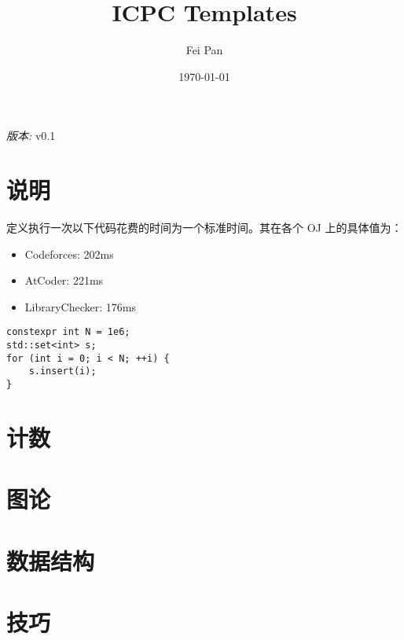 \documentclass[12pt]{ctexart}
\title{ICPC Templates}
\date{\today}
\author{Fei Pan}
\newcommand{\version}{v0.1}
\begin{document}
\maketitle
\begin{center}
    \textit{版本: }\version
\end{center}

\tableofcontents
\newpage

\section{说明}

定义执行一次以下代码花费的时间为一个标准时间。其在各个 OJ 上的具体值为：

\begin{itemize}
\item Codeforces: 202ms
\item AtCoder: 221ms
\item LibraryChecker: 176ms
\end{itemize}
\begin{lstlisting}
constexpr int N = 1e6;
std::set<int> s;
for (int i = 0; i < N; ++i) {
    s.insert(i);
}
\end{lstlisting}
\newpage

\section{计数}



\section{图论}



\section{数据结构}


\section{技巧}

\end{document}

